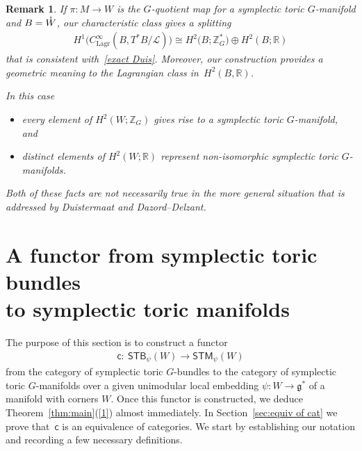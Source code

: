 \documentclass[pdftex]{sigma}
\numberwithin{equation}{section}
\newtheorem{Remark}[Lemma]{Remark}
\begin{document}
\begin{Remark}\label{rmrk:1.11}
If $\pi \colon M \to W$ is the $G$-quotient map for a symplectic toric
$G$-manifold and $B = {\mathaccent23{W}}$, our characteristic class gives a splitting
\begin{gather*}
 H^1\big(C^{\infty}_{\text{Lagr}}(B,T^*B/{\mathcal L})\big) \cong H^2\big(B;{\mathbb Z}_G^*\big) \oplus H^2(B;{\mathbb R})
\end{gather*}
that is consistent with~\eqref{exact Duis}.
Moreover, our construction
provides a geometric meaning to the Lagrangian class in~$H^2(B,{\mathbb R})$.

In this case
\begin{itemize}\itemsep=0pt
\item
every element of $H^2(W;{\mathbb Z}_G)$ gives rise to a symplectic toric $G$-manifold,
and
\item
distinct elements of $H^2(W;{\mathbb R})$ represent non-isomorphic symplectic toric
$G$-manifolds.
\end{itemize}
Both of these facts are not necessarily true in the more general situation
that is addressed by Duistermaat and Dazord--Delzant.
\end{Remark}




\section{A functor from symplectic toric bundles\\ to symplectic toric manifolds}
\label{sec:collapse}

The purpose of this section is to construct a  functor
 \begin{gather*}
 {\textsf{c}} \colon \  {\textsf{STB}}_{\psi}(W)   \to
                   {\textsf{STM}}_{\psi}(W)
\end{gather*}
from the category of symplectic toric $G$-bundles to the category of
symplectic toric $G$-manifolds over a given unimodular local embedding
$\psi\colon W\to {\mathfrak g}^*$ of a manifold with corners $W$. Once this functor
is constructed, we deduce Theorem~\ref{thm:main}(\ref{1}) almost
immediately.  In Section~\ref{sec:equiv of cat} we  prove that~${\textsf{c}}$ is an equivalence of categories.  We start by establishing
our notation and recording a few necessary
def\/initions.
\end{document}
